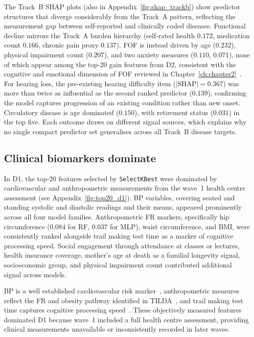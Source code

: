 The Track~B \gls{SHAP} plots (also in Appendix~\ref{fig:shap_trackb}) show predictor structures that diverge considerably from the Track~A pattern, reflecting the measurement gap between self-reported and clinically coded diseases. Functional decline mirrors the Track~A burden hierarchy (self-rated health $0.172$, medication count $0.166$, chronic pain proxy $0.137$). \gls{FOF} is instead driven by age ($0.232$), physical impairment count ($0.207$), and two anxiety measures ($0.110$, $0.071$), none of which appear among the top-20 gain features from D2, consistent with the cognitive and emotional dimension of \gls{FOF} reviewed in Chapter~\ref{ch:chapter2}~\cite{jacobFallsIncreaseRisk2023}. For hearing loss, the pre-existing hearing difficulty item ($|\text{SHAP}| = 0.367$) was more than twice as influential as the second ranked predictor ($0.139$), confirming the model captures progression of an existing condition rather than new onset. Circulatory disease is age dominated ($0.150$), with retirement status ($0.031$) in the top five. Each outcome draws on different signal sources, which explains why no single compact predictor set generalises across all Track~B disease targets.

\subsection{Clinical biomarkers dominate}
In D1, the top-20 features selected by \texttt{SelectKBest} were dominated by cardiovascular and anthropometric measurements from the wave~1 health centre assessment (see Appendix~\ref{fig:top20_d1}). \gls{BP} variables, covering seated and standing systolic and diastolic readings and their means, appeared prominently across all four model families. Anthropometric \gls{FR} markers, specifically hip circumference ($0.084$ for \gls{RF}, $0.037$ for \gls{MLP}), waist circumference, and \gls{BMI}, were consistently ranked alongside trail making test time as a marker of cognitive processing speed. Social engagement through attendance at classes or lectures, health insurance coverage, mother's age at death as a familial longevity signal, socioeconomic group, and physical impairment count contributed additional signal across models.

\gls{BP} is a well established cardiovascular risk marker~\cite{matthewsPredictingMortalityIrish2022}, anthropometric measures reflect the \gls{FR} and obesity pathway identified in \gls{TILDA}~\cite{huangAgeModifyAssociations2019}, and trail making test time captures cognitive processing speed~\cite{boyleBrainpredictedAgeDifference2021}. These objectively measured features dominated D1 because wave~1 included a full health centre assessment, providing clinical measurements unavailable or inconsistently recorded in later waves.

